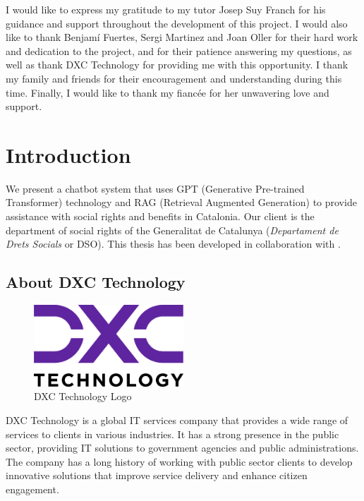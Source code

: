 \documentclass[a4paper,12pt,twoside]{ThesisStyle}
\begin{document}
I would like to express my gratitude to my tutor Josep Suy Franch for his guidance and support throughout the development of this project. I would also like to thank Benjamí Fuertes, Sergi Martinez and Joan Oller for their hard work and dedication to the project, and for their patience answering my questions, as well as thank DXC Technology for providing me with this opportunity. I thank my family and friends for their encouragement and understanding during this time.
Finally, I would like to thank my fiancée for her unwavering love and support.


\tableofcontents

\listoffigures

\listoftables

\mainmatter

\chapter{Introduction}
\label{cap:intro}

We present a chatbot system that uses GPT (Generative Pre-trained Transformer) technology and RAG (Retrieval Augmented Generation) to provide assistance with social rights and benefits in Catalonia. Our client is the department of social rights of the Generalitat de Catalunya (\textit{Departament de Drets Socials} or DSO). This thesis has been developed in collaboration with .

\section{About DXC Technology}
\label{sec:dxc}

\begin{figure}[htb]
  \centering
  \includegraphics[width=0.5\textwidth]{img/DXC_Technology_Logo.png}
  \caption{DXC Technology Logo}
  \label{fig:dxc_logo}
\end{figure}

DXC Technology is a global IT services company that provides a wide range of services to clients in various industries. It has a strong presence in the public sector, providing IT solutions to government agencies and public administrations. The company has a long history of working with public sector clients to develop innovative solutions that improve service delivery and enhance citizen engagement.
\end{document}
